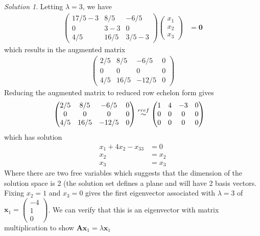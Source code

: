 \documentclass[
]{book}
\theoremstyle{definition}
\theoremstyle{definition}
\theoremstyle{definition}
\theoremstyle{definition}
\theoremstyle{remark}
\newtheorem*{solution}{Solution}
\begin{document}
\begin{solution}
Letting \(\lambda = 3\), we have
\[
\begin{aligned}
\begin{pmatrix} 
17/5  - 3 & 8/5 & -6/5 \\
0 & 3 - 3 & 0 \\
4/5 & 16/5 & 3/5 - 3
\end{pmatrix} \begin{pmatrix} x_1 \\ x_2 \\ x_3 \end{pmatrix} & = \mathbf{0}
\end{aligned}
\]
which results in the augmented matrix
\[
\begin{aligned}
\begin{pmatrix} 2/5 & 8/5 & -6/5 & 0 \\ 0 & 0 & 0 & 0 \\ 4/5 & 16/5 & -12/5 & 0 \end{pmatrix}
\end{aligned}
\]
Reducing the augmented matrix to reduced row echelon form gives
\[
\begin{aligned}
\begin{pmatrix} 2/5 & 8/5 & -6/5 & 0 \\ 0 & 0 & 0 & 0 \\ 4/5 & 16/5 & -12/5 & 0 \end{pmatrix} & \stackrel{rref}{\huge \sim} \begin{pmatrix} 1 & 4 & -3 & 0 \\ 0 & 0 & 0 & 0 \\ 0 & 0 & 0 & 0 \end{pmatrix}
\end{aligned}
\]
which has solution
\[
\begin{aligned}
x_1 + 4 x_2 - x_33 & = 0 \\
x_2 & = x_2 \\
x_3 & = x_3
\end{aligned}
\]
Where there are two free variables which suggests that the dimension of the solution space is 2 (the solution set defines a plane and will have 2 basis vectors. Fixing \(x_2 = 1\) and \(x_3 = 0\) gives the first eigenvector associated with \(\lambda = 3\) of \(\mathbf{x}_1 = \begin{pmatrix} -4 \\ 1 \\ 0 \end{pmatrix}\). We can verify that this is an eigenvector with matrix multiplication to show \(\mathbf{A} \mathbf{x}_1 = \lambda \mathbf{x}_1\)

\end{solution}
\end{document}

